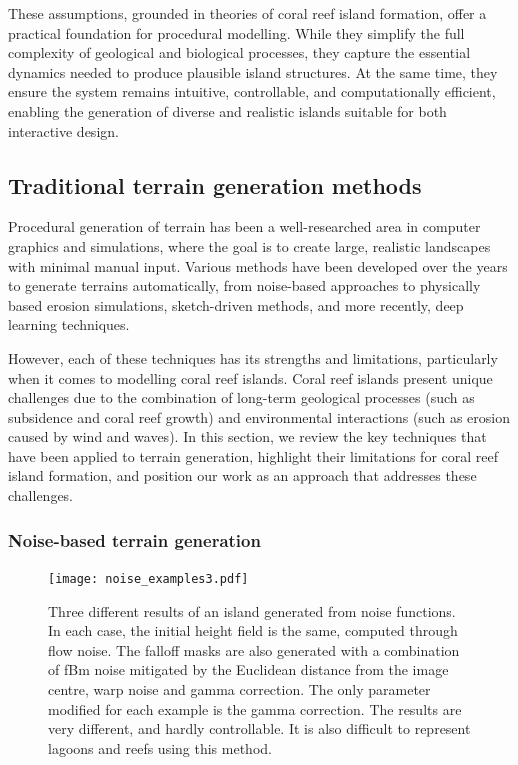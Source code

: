These assumptions, grounded in theories of coral reef island formation, offer a practical foundation for procedural modelling. While they simplify the full complexity of geological and biological processes, they capture the essential dynamics needed to produce plausible island structures. At the same time, they ensure the system remains intuitive, controllable, and computationally efficient, enabling the generation of diverse and realistic islands suitable for both interactive design.





\subsection{Traditional terrain generation methods}
\label{sec:coral-island-sota-traditional}

Procedural generation of terrain has been a well-researched area in computer graphics and simulations, where the goal is to create large, realistic landscapes with minimal manual input. Various methods have been developed over the years to generate terrains automatically, from noise-based approaches to physically based erosion simulations, sketch-driven methods, and more recently, deep learning techniques.

However, each of these techniques has its strengths and limitations, particularly when it comes to modelling coral reef islands. Coral reef islands present unique challenges due to the combination of long-term geological processes (such as subsidence and coral reef growth) and environmental interactions (such as erosion caused by wind and waves). In this section, we review the key techniques that have been applied to terrain generation, highlight their limitations for coral reef island formation, and position our work as an approach that addresses these challenges.

\subsubsection{Noise-based terrain generation}

\begin{figure}[ht]
\centering
\texttt{[image: noise\_examples3.pdf]}
\caption{Three different results of an island generated from noise functions. In each case, the initial height field is the same, computed through flow noise. The falloff masks are also generated with a combination of fBm noise mitigated by the Euclidean distance from the image centre, warp noise and gamma correction. The only parameter modified for each example is the gamma correction. The results are very different, and hardly controllable. It is also difficult to represent lagoons and reefs using this method.}
\label{fig:coral-island-noise-example}
\end{figure}


